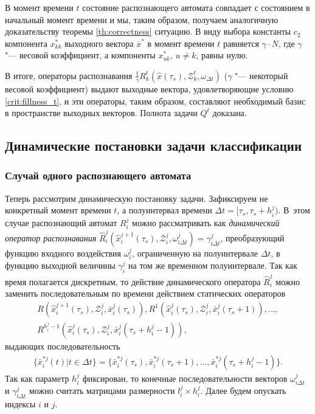 \begin{Proof}
	В момент времени $t$ состояние распознающего автомата совпадает с состоянием в начальный момент времени и мы, таким образом, получаем аналогичную доказательству теоремы \ref{th:correctness} ситуацию. В виду выбора константы $c_2$ компонента $x_{kk}^*$ выходного вектора $\bar x^*$ в момент времени $t$ равняется $\gamma\cdot N$, где $\gamma$ "--- весовой коэффициент, а компоненты $x_{uk}^*$, $u\not=k$, равны нулю.
 	
	В итоге, операторы распознавания $\frac{1}{\gamma}R_k^t(\hat x(\tau_s),\mathcal Z_k^t, \omega_{\Delta t})$ ($\gamma$ "--- некоторый весовой коэффициент) выдают выходные вектора, удовлетворяющие условию \ref{crit:fillness_t}, и эти операторы, таким образом, составляют необходимый базис в пространстве выходных векторов. Полнота задачи $Q^t$ доказана.
\end{Proof}

\subsection{Динамические постановки задачи классификации}

\subsubsection{Случай одного распознающего автомата}

Теперь рассмотрим динамическую постановку задачи. Зафиксируем не конкретный момент времени $t$, а полуинтервал времени ${\Delta}t=[\tau_s,\tau_s+h_i^j)$. В~этом случае распознающий автомат $R_i^j$ можно рассматривать как \textit{динамический оператор распознавания} $\hat{R}_i^j(\hat{x}_i^{j+1}(\tau_s), \mathcal{Z}_i^j, \omega_{i\Delta{t}}^j)=\gamma_{i\Delta{t}}^j$, преобразующий  функцию входного воздействия $\omega_i^j$, ограниченную на полуинтервале ${\Delta}t$, в функцию выходной величины $\gamma_i^j$ на том же временном полуинтервале. Так как время полагается дискретным, то действие динамического оператора $\hat{R}_i^j$ можно заменить последовательным по времени действием статических операторов 
\begin{eqnarray}
	R(\hat x_i^{j+1}(\tau_s), \mathcal{Z}_i^j, \bar{x}_i^j(\tau_s)), R^1(\hat x_i^j(\tau_s), \mathcal Z_i^j, \bar x_i^j(\tau_s+1)), \dots,\nonumber\\
	R^{h_i^j-1}(\hat x_i^j(\tau_s), \mathcal Z_i^j, \bar x_i^j(\tau_s+h_i^j-1)),
\end{eqnarray}
выдающих последовательность 
\begin{eqnarray}
	\{\bar{x}_i^{*j}(t)|t\in\Delta t\}=\{\bar{x}_i^{*j}(\tau_s), \bar{x}_i^{*j}(\tau_s+1), \dots, \bar{x}_i^{*j}(\tau_s+h_i^j-1)\}.
\end{eqnarray}
Так как параметр $h_i^j$ фиксирован, то конечные последовательности векторов  $\omega_{i\Delta{t}}^j$ и $\gamma_{i\Delta{t}}^j$ можно считать матрицами размерности $l_i^j\times{h_i^j}$. Далее будем опускать индексы $i$ и $j$.
	
